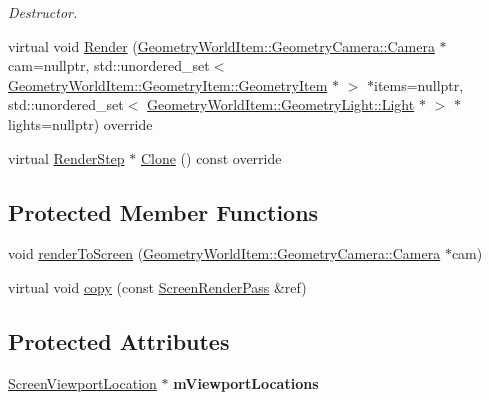 \begin{DoxyCompactItemize}
\begin{DoxyCompactList}\small\item\em Destructor. \end{DoxyCompactList}\item 
virtual void \mbox{\hyperlink{class_geometry_engine_1_1_geometry_render_step_1_1_screen_render_pass_a53ab5f8ea2c7ed3c116474731ff41815}{Render}} (\mbox{\hyperlink{class_geometry_engine_1_1_geometry_world_item_1_1_geometry_camera_1_1_camera}{Geometry\+World\+Item\+::\+Geometry\+Camera\+::\+Camera}} $\ast$cam=nullptr, std\+::unordered\+\_\+set$<$ \mbox{\hyperlink{class_geometry_engine_1_1_geometry_world_item_1_1_geometry_item_1_1_geometry_item}{Geometry\+World\+Item\+::\+Geometry\+Item\+::\+Geometry\+Item}} $\ast$ $>$ $\ast$items=nullptr, std\+::unordered\+\_\+set$<$ \mbox{\hyperlink{class_geometry_engine_1_1_geometry_world_item_1_1_geometry_light_1_1_light}{Geometry\+World\+Item\+::\+Geometry\+Light\+::\+Light}} $\ast$ $>$ $\ast$lights=nullptr) override
\item 
virtual \mbox{\hyperlink{class_geometry_engine_1_1_geometry_render_step_1_1_render_step}{Render\+Step}} $\ast$ \mbox{\hyperlink{class_geometry_engine_1_1_geometry_render_step_1_1_screen_render_pass_a125bea5e92ff920b57012f9b0b177a1e}{Clone}} () const override
\end{DoxyCompactItemize}
\subsection*{Protected Member Functions}
\begin{DoxyCompactItemize}
\item 
void \mbox{\hyperlink{class_geometry_engine_1_1_geometry_render_step_1_1_screen_render_pass_a6a1f221c4b08fd2eae86e359e9b84829}{render\+To\+Screen}} (\mbox{\hyperlink{class_geometry_engine_1_1_geometry_world_item_1_1_geometry_camera_1_1_camera}{Geometry\+World\+Item\+::\+Geometry\+Camera\+::\+Camera}} $\ast$cam)
\item 
virtual void \mbox{\hyperlink{class_geometry_engine_1_1_geometry_render_step_1_1_screen_render_pass_a38fa6de5c3c8a46b365b59d3e29267b7}{copy}} (const \mbox{\hyperlink{class_geometry_engine_1_1_geometry_render_step_1_1_screen_render_pass}{Screen\+Render\+Pass}} \&ref)
\end{DoxyCompactItemize}
\subsection*{Protected Attributes}
\begin{DoxyCompactItemize}
\item 
\mbox{\label{class_geometry_engine_1_1_geometry_render_step_1_1_screen_render_pass_aa46da716412cf90640a9323e82e6975e}} 
\mbox{\hyperlink{class_geometry_engine_1_1_geometry_render_step_1_1_screen_viewport_location}{Screen\+Viewport\+Location}} $\ast$ {\bfseries m\+Viewport\+Locations}
\end{DoxyCompactItemize}



